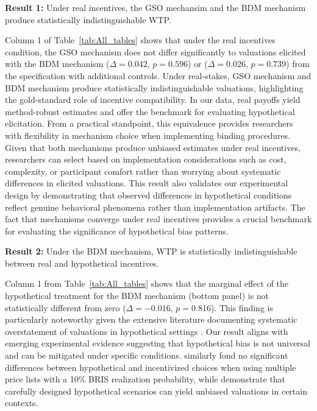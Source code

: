 \documentclass[12pt]{article}
\begin{document}

\textbf{Result 1:} Under real incentives, the GSO mechansim and the BDM mechanism produce statistically indistinguishable WTP. 

Column 1 of Table~\ref{tab:All_tables} shows that under the real incentives condition, the GSO mechanism does not differ significantly to valuations elicited with the BDM mechanism (\(\Delta = 0.042\), \(p =0.596\)) or (\(\Delta = 0.026\), \(p =0.739\)) from the specification with additional controls. Under real-stakes, GSO mechanism and BDM mechanism produce statistically indistinguishable valuations, highlighting the gold-standard role of incentive compatibility. In our data, real payoffs yield method-robust estimates and offer the benchmark for evaluating hypothetical elicitation. 
From a practical standpoint, this equivalence provides researchers with flexibility in mechanism choice when implementing binding procedures. Given that both mechanisms produce unbiased estimates under real incentives, researchers can select based on implementation considerations such as cost, complexity, or participant comfort rather than worrying about systematic differences in elicited valuations.
This result also validates our experimental design by demonstrating that observed differences in hypothetical conditions reflect genuine behavioral phenomena rather than implementation artifacts. The fact that mechanisms converge under real incentives provides a crucial benchmark for evaluating the significance of hypothetical bias patterns. 


\vspace{0.5cm}

\textbf{Result 2:} Under the BDM mechanism, WTP is statistically indistinguishable between real and hypothetical incentives.

Column 1 from Table~\ref{tab:All_tables} shows that the marginal effect of the hypothetical treatment for the BDM mechanism (bottom panel) is not statistically different from zero (\(\Delta = -0.016\), \(p =0.816\)). This finding is particularly noteworthy given the extensive literature documenting systematic overstatement of valuations in hypothetical settings \citep{penn2018understanding, loomis_whats_2011}.
Our result aligns with emerging experimental evidence suggesting that hypothetical bias is not universal and can be mitigated under specific conditions. \citet{branas-garza_paid_2023} similarly fond no significant differences between hypothetical and incentivized choices when using multiple price lists with a 10\% BRIS realization probability, while \citet{drichoutis_incentives_2025} demonstrate that carefully designed hypothetical scenarios can yield unbiased valuations in certain contexts.
\end{document}

